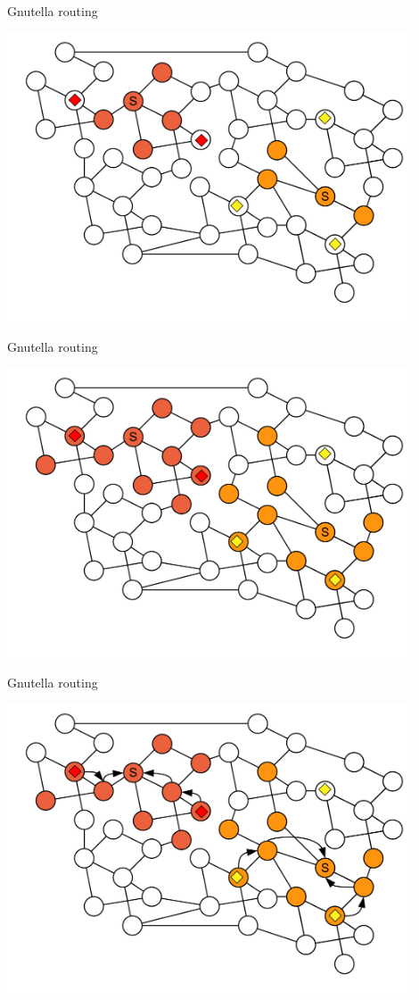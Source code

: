 \begin{frame}{Gnutella routing}
	
\includegraphics[width=0.9\textwidth]{gnutella3}

\end{frame}

\begin{frame}{Gnutella routing}
	
\includegraphics[width=0.9\textwidth]{gnutella4}

\end{frame}

\begin{frame}{Gnutella routing}
	
\includegraphics[width=0.9\textwidth]{gnutella5}

\end{frame}

